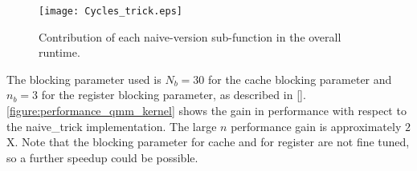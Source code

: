 \begin{figure}[h]
\texttt{[image: Cycles\_trick.eps]}
\caption{Contribution of each naive-version sub-function in the overall runtime.} 
\label{figure:Cycles_trick}
\end{figure}


The blocking parameter used is $N_b = 30$ for the cache blocking parameter and $n_b = 3$ for the register blocking parameter, as described in \cref{}. \cref{figure:performance_qmm_kernel} shows the gain in performance with respect to the naive\_trick implementation. The large $n$ performance gain is approximately $2$X. Note that the blocking parameter for cache and for register are not fine tuned, so a further speedup could be possible.

\begin{comment}
Next divide the experiments into classes, one paragraph for each. In the simplest case you have one plot that has the size on the x-axis and the performance on the y-axis. The plot will contain several lines, one for each relevant code version. Discuss the plot and extract the overall performance gain from baseline to best code. Also state the percentage of peak performance for the best code. Note that the peak may change depending on the situation. For example, if you only do additions it would be 12 Gflop/s
on one core with 3 Ghz and SSE and single precision floating point.

Do not put two performance lines into the same plot if the operations count changed significantly (that's apples and oranges). In that case first perform the optimizations that reduce op count and report the runtime gain in a plot. Then continue to optimize the best version and show performance plots.

{\bf You should}
\begin{itemize}
\item Follow the guide to benchmarking presented in class, in particular
\item very readable, attractive plots (do 1 column, not 2 column plots
for this class), proper readable font size. An example is below (of course you can have a different style),
\item every plot answers a question, which you pose and extract the
answer from the plot in its discussion
\end{itemize}
Every plot should be discussed (what does it show, which statements do
you extract).
\end{comment}

